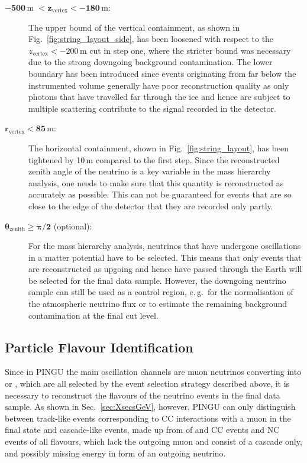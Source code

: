 \begin{description}
 \item[$\mathbf{-500}$\,m $\mathbf{< z_\mathrm{vertex} < -180}$\,m:] The upper
  bound of the vertical containment, as shown in
  Fig.~\ref{fig:string_layout_side}, has been loosened with respect to the
  $z_\mathrm{vertex} < -200$\,m cut in step one, where the stricter bound was
  necessary due to the strong downgoing background contamination. The lower
  boundary has been introduced since events originating from far below the
  instrumented volume generally have poor reconstruction quality as only
  photons that have travelled far through the ice and hence are subject to
  multiple scattering contribute to the signal recorded in the detector.

 \item[$\mathbf{r_\mathrm{vertex} < 85}$\,m:] The horizontal containment, shown
  in Fig.~\ref{fig:string_layout}, has  been tightened by 10\,m compared to the
  first step. Since the reconstructed  zenith angle of the neutrino is a key
  variable in the mass hierarchy  analysis, one needs to make sure that this
  quantity is reconstructed as accurately as possible. This can not be
  guaranteed for events that are so  close to the edge of the detector that they
  are recorded only partly.

 \item[$\mathbf{\theta_\mathrm{zenith} \geq \pi/2}$ (optional):] For the mass
  hierarchy analysis, neutrinos that have undergone oscillations in a matter
  potential have to be selected. This means that only events that are
  reconstructed as upgoing and hence have passed through the Earth will be
  selected for the final data sample. However, the downgoing neutrino sample
  can still be used as a control region, e.\,g.\ for the normalisation of the
  atmospheric neutrino flux or to estimate the remaining background
  contamination at the final cut level.
\end{description}

\subsection{Particle Flavour Identification}
\label{sec:cuts_PID}

Since in PINGU the main oscillation channels are muon neutrinos converting into
\nue or \nutau, which are all selected by the event selection strategy
described above, it is necessary to reconstruct the flavours of the neutrino
events in the final data sample. As shown in Sec.~\ref{sec:XsecsGeV},
however, PINGU can only distinguish between track-like events corresponding to
\numu CC interactions with a muon in the final state and cascade-like events,
made up from of \nue and \nutau CC events and NC events of all flavours,
which lack the outgoing muon and consist of a cascade only, and possibly
missing energy in form of an outgoing neutrino.

